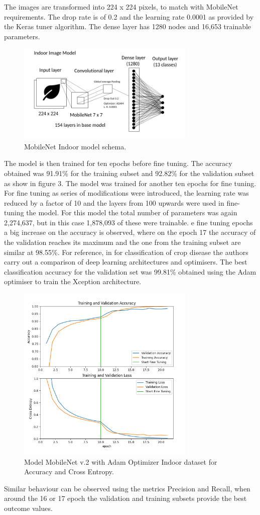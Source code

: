 \documentclass[conference]{IEEEtran}
\begin{document}
The images are transformed into 224 x 224 pixels, to match with MobileNet requirements. The drop rate is of 0.2 and the learning rate 0.0001 as provided by the Keras tuner algorithm. The dense layer has 1280 nodes and 16,653 trainable parameters. \
\begin{figure}[htbp]
\centerline{\includegraphics[width=8.5cm]{ModelIndoorsMobileNet.png}}
\caption{MobileNet Indoor model schema.}
\label{fig}
\end{figure}
The model is then trained for ten epochs before fine tuning. The accuracy obtained was 91.91\% for the training subset and 92.82\% for the validation subset as show in figure 3. The model was trained for another ten epochs for fine tuning. For fine tuning as series of modifications were introduced, the learning rate was reduced by a factor of 10 and the layers from 100 upwards were used in fine-tuning the model. For this model the total number of parameters was again 2,274,637, but in this case 1,878,093 of these were trainable. e fine tuning epochs a big increase on the accuracy is observed, where on the epoch 17 the accuracy of the validation reaches its maximum and the one from the training subset are similar at 98.55\%. For reference, in \cite{saleem2020plant} for classification of crop disease the authors carry out a comparison of deep learning architectures and optimisers. The best classification accuracy for the validation set was 99.81\% obtained using the Adam optimiser to train the Xception architecture.  
    
\begin{figure}[htbp]
\centerline{\includegraphics[width=8.5cm]{ModelIndoorsMobileNetEpochsAccuracychart.png}}
\caption{Model MobileNet v.2 with Adam Optimizer Indoor dataset for Accuracy and Cross Entropy.}
\label{fig}
\end{figure}
Similar behaviour can be observed using the metrics Precision and Recall, when around the 16 or 17 epoch the validation and training subsets provide the best outcome values. 
\end{document}
